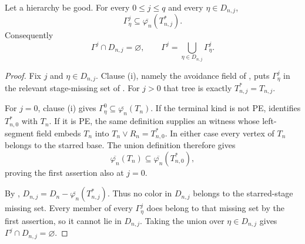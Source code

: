 \begin{lemma}
Let a hierarchy be good.  For every $0\leq j\leq q$ and every
$\eta\in D_{n,j}$,
\[
 \Gamma^j_\eta\subseteq
 \overline{\varphi_n}(T_{n,j}^{*}).
\]
Consequently
\[
 \Gamma^j\cap D_{n,j}=\varnothing,\qquad
 \Gamma^j=\bigcup_{\eta\in D_{n,j}}\Gamma^j_\eta.
\]
\end{lemma}
\begin{proof}
Fix $j$ and $\eta\in D_{n,j}$.  Clause (i), namely the avoidance field
of , puts $\Gamma^j_\eta$ in the relevant
stage-missing set of .  For
$j>0$ that tree is exactly $T_{n,j}^{*}=T_{n,j}$.

For $j=0$, clause (i) gives
$\Gamma^0_\eta\subseteq\overline{\varphi_n}(T_n)$.  If the terminal
kind is not PE,  identifies
$T_{n,0}^{*}$ with $T_n$.  If it is PE, the same definition supplies
an  witness whose left-segment field embeds
$T_n$ into $T_n\vee R_n=T_{n,0}^{*}$.  In either case every vertex of
$T_n$ belongs to the starred base.  The union definition
 therefore gives
\[
 \overline{\varphi_n}(T_n)
 \subseteq\overline{\varphi_n}(T_{n,0}^{*}),
\]
proving the first assertion also at $j=0$.

By ,
$D_{n,j}=D_n-\overline{\varphi_n}(T_{n,j}^{*})$.  Thus no color in
$D_{n,j}$ belongs to the starred-stage missing set.  Every member of
every $\Gamma^j_\eta$ does belong to that missing set by the first
assertion, so it cannot lie in $D_{n,j}$.  Taking the union over
$\eta\in D_{n,j}$ gives
$\Gamma^j\cap D_{n,j}=\varnothing$.
\end{proof}
